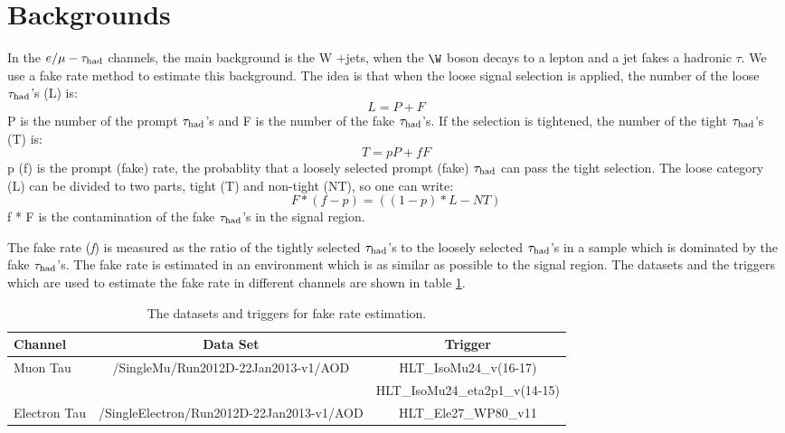 \section{Backgrounds}
\label{sect:bkgLeptau}
In the $e/\mu-\tau_{\rm had}$ channels, the main background is the W +jets, when the $\W$ boson decays to a lepton and a jet fakes a hadronic $\tau$.
We use a fake rate method to estimate this background. 
The idea is that when the loose signal selection is applied, the number of the loose $\tau_{\rm had}$'s (L) is:
\begin{equation}
L = P + F
\end{equation}
P is the number of the  prompt $\tau_{\rm had}$'s and F is the number of the  fake $\tau_{\rm had}$'s. If the selection is tightened, the number of the tight $\tau_{\rm had}$'s (T) is:
\begin{equation}
 T = pP + fF
\end{equation} 
p (f) is the prompt (fake) rate, the probablity that a loosely selected prompt (fake) $\tau_{\rm had}$ can pass the  tight  selection. The loose category (L) can be divided to two parts, 
tight (T) and non-tight (NT), so one can write:
\begin{equation}
   F * (f - p) = ((1 - p) * L - NT)
\end{equation}
f * F is the contamination of the fake $\tau_{\rm had}$'s in the signal region. 

The fake rate ({\it f}) is measured as the ratio of the tightly selected $\tau_{\rm had}$'s to the loosely 
selected $\tau_{\rm had}$'s in a sample which is dominated by the fake $\tau_{\rm had}$'s. The fake rate is estimated in an environment which is as similar as possible to 
the signal region. The datasets and the triggers which are used to estimate the fake rate in different channels are shown in 
table \ref{Tab.DataFR}.
\begin{table}[!htb]
\begin{center}
\caption{The datasets and triggers for fake rate estimation.}
\label{Tab.DataFR}
\begin{tabular}{|l|c|c|}
\hline
Channel      & Data Set                                     & Trigger \\\hline
Muon Tau     & /SingleMu/Run2012D-22Jan2013-v1/AOD          & HLT\_IsoMu24\_v(16-17)\\
             &                                              & HLT\_IsoMu24\_eta2p1\_v(14-15)\\\hline
Electron Tau & /SingleElectron/Run2012D-22Jan2013-v1/AOD    & HLT\_Ele27\_WP80\_v11\\
\hline
\end{tabular}
\end{center}
\end{table}

